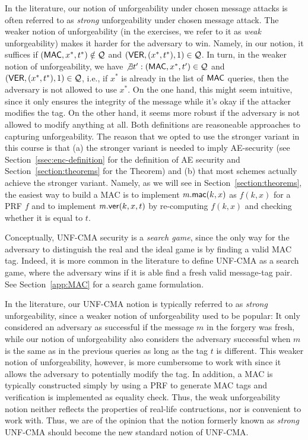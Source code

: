 \begin{remark} In the literature, our notion of unforgeability under chosen message attacks is often referred to
 as \emph{strong} unforgeability under chosen message attack. The weaker notion of unforgeability (in the exercises, we
refer to it as \emph{weak} unforgeability) makes it harder for the adversary to win. Namely, in our notion, it suffices
if $(\mathsf{MAC}, x^*,t^*)\notin \mathcal{Q}$ and $(\mathsf{VER}, (x^*,t^*),1)\in \mathcal{Q}$. In turn, in the weaker notion
of unforgeability, we have $\not\exists t':(\mathsf{MAC}, x^*,t')\in \mathcal{Q}$ and $(\mathsf{VER}, (x^*,t^*),1)\in \mathcal{Q}$,
i.e., if $x^*$ is already in the list of $\mathsf{MAC}$ queries, then the adversary is not allowed to use $x^*$. On the one
hand, this might seem intuitive, since it only ensures the integrity of the message while it's okay if the attacker
modifies the tag. On the other hand, it seems more robust if the adversary is not allowed to modify anything at all.
Both definitions are reasoneable approaches to capturing unforgeability. The reason that we opted to use the
stronger variant in this course is that (a) the stronger variant is needed to imply AE-security (see Section~\ref{ssec:enc-definition}
for the definition of AE security and Section~\ref{section:theorems} for the Theorem) and (b) that most schemes actually
achieve the stronger variant. Namely, as we will see in Section~\ref{section:theorems}, the easiest way to build a MAC
is to implement $\mathit{{m}}.\mathsf{mac}(k,x)$ as $f(k,x)$ for a PRF $f$ and to implement $\mathit{{m}}.\mathsf{ver}(k,x,t)$ by re-computing $f(k,x)$ and
checking whether it is equal to $t$.
\end{remark}

\begin{remark}
Conceptually, UNF-CMA security is a \emph{search game}, since the only way for the adversary to distinguish the real and the ideal game is by finding a valid MAC tag. Indeed, it is more common in the literature to define UNF-CMA as a search game, where the adversary wins if it is able find a fresh valid message-tag pair. See Section~\ref{app:MAC} for a search game formulation.
\end{remark}

\begin{remark}
In the literature, our UNF-CMA notion is typically referred to as \emph{strong} unforgeability, since a weaker notion of unforgeability used to be popular: It only considered an adversary as successful if the message $m$ in the forgery was fresh, while our notion of unforgeability also considers the adversary successful when $m$ is the same as in the previous queries as long as the tag $t$ is different. This weaker notion of unforgeability, however, is more cumbersome to work with since it allows the adversary to potentially modify the tag. In addition, a MAC is typically constructed simply by using a PRF to generate MAC tags and verification is implemented as equality check. Thus, the weak unforgeability notion neither reflects the properties of real-life contructions, nor is convenient to work with. Thus, we are of the opinion that the notion formerly known as \emph{strong} UNF-CMA should become the new standard notion of UNF-CMA.
\end{remark}
